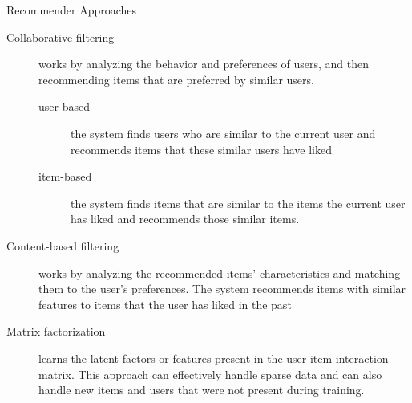 \documentclass[aspectratio=169]{../latex_main/tntbeamer}  %
\begin{document}
   \begin{frame}{Recommender Approaches}

        \begin{description}
            \item[Collaborative filtering] works by analyzing the behavior and preferences of users, and then recommending items that are preferred by similar users. 
            \begin{description}
                \item[user-based] the system finds users who are similar to the current user and recommends items that these similar users have liked
                \item[item-based] the system finds items that are similar to the items the current user has liked and recommends those similar items.
            \end{description}
           \pause
           \item[Content-based filtering] works by analyzing the recommended items' characteristics and matching them to the user's preferences. The system recommends items with similar features to items that the user has liked in the past
            \item[Matrix factorization] learns the latent factors or features present in the user-item interaction matrix. This approach can effectively handle sparse data and can also handle new items and users that were not present during training.
        \end{description}
       
   \end{frame}
\end{document}
